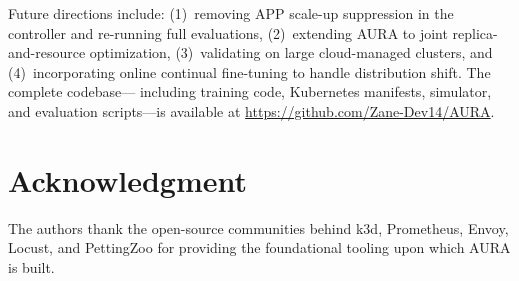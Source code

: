 \documentclass[conference]{IEEEtran}
\begin{document}
Future directions include: (1)~removing APP scale-up suppression in the
controller and re-running full evaluations, (2)~extending AURA to
joint replica-and-resource optimization, (3)~validating on large
cloud-managed clusters, and (4)~incorporating online continual
fine-tuning to handle distribution shift. The complete codebase---
including training code, Kubernetes manifests, simulator, and
evaluation scripts---is available at
\url{https://github.com/Zane-Dev14/AURA}.

\section*{Acknowledgment}

The authors thank the open-source communities behind k3d, Prometheus,
Envoy, Locust, and PettingZoo for providing the foundational tooling
upon which AURA is built.
\end{document}
